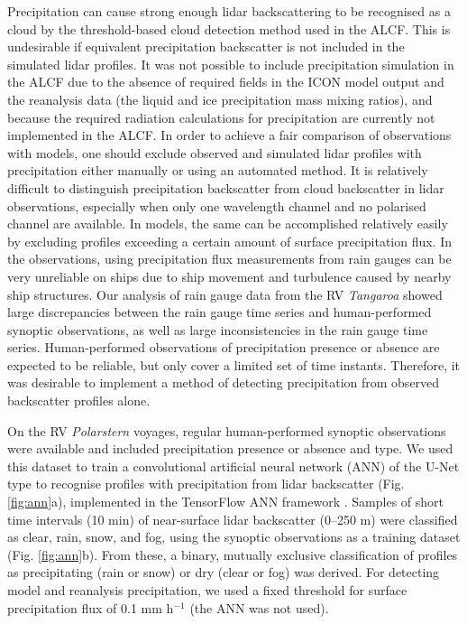 \documentclass[12pt,a4paper]{article}
\begin{document}
Precipitation can cause strong enough lidar backscattering to be recognised as
a cloud by the threshold-based cloud detection method used in the ALCF. This is
undesirable if equivalent precipitation backscatter is not included in the
simulated lidar profiles. It was not possible to include precipitation
simulation in the ALCF due to the absence of required fields in the ICON model
output and the reanalysis data (the liquid and ice precipitation mass mixing
ratios), and because the required radiation calculations for precipitation are
currently not implemented in the ALCF. In order to achieve a fair comparison of
observations with models, one should exclude observed and simulated lidar
profiles with precipitation either manually or using an automated method. It is
relatively difficult to distinguish precipitation backscatter from cloud
backscatter in lidar observations, especially when only one wavelength channel
and no polarised channel are available. In models, the same can be accomplished
relatively easily by excluding profiles exceeding a certain amount of surface
precipitation flux. In the observations, using precipitation flux measurements
from rain gauges can be very unreliable on ships due to ship movement and
turbulence caused by nearby ship structures. Our analysis of rain gauge data
from the RV \emph{Tangaroa} showed large discrepancies between the rain gauge
time series and human-performed synoptic observations, as well as large
inconsistencies in the rain gauge time series. Human-performed observations of
precipitation presence or absence are expected to be reliable, but only cover a
limited set of time instants. Therefore, it was desirable to implement a method
of detecting precipitation from observed backscatter profiles alone.

On the RV \emph{Polarstern} voyages, regular human-performed synoptic
observations were available and included precipitation presence or absence and
type. We used this dataset to train a convolutional artificial neural network
(ANN) of the U-Net type \citep{ronneberger2015} to recognise profiles with
precipitation from lidar backscatter (Fig. \ref{fig:ann}a), implemented in the
TensorFlow ANN framework \citep{tensorflow}. Samples of short time intervals
(10 min) of near-surface lidar backscatter (0–250 m) were classified as clear,
rain, snow, and fog, using the synoptic observations as a training dataset
(Fig.  \ref{fig:ann}b). From these, a binary, mutually exclusive classification
of profiles as precipitating (rain or snow) or dry (clear or fog) was derived.
For detecting model and reanalysis precipitation, we used a fixed threshold for
surface precipitation flux of 0.1 mm h$^{-1}$ (the ANN was not used).
\end{document}
